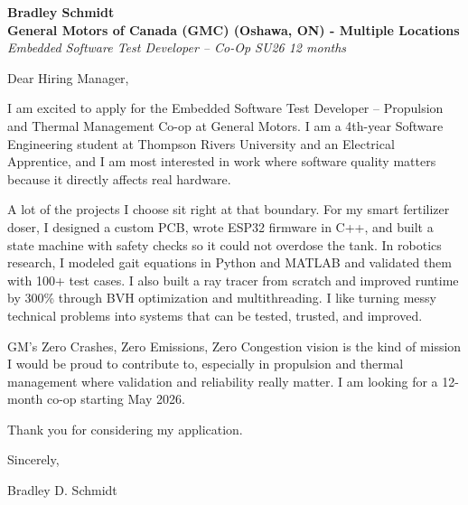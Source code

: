 \documentclass[11pt]{article}
\begin{document}
\textbf{Bradley Schmidt}\\
\vspace{0.5em}
\textbf{General Motors of Canada (GMC) (Oshawa, ON) - Multiple Locations}\\
\textit{Embedded Software Test Developer – Co-Op SU26 12 months}

Dear Hiring Manager,

\par

I am excited to apply for the Embedded Software Test Developer – Propulsion and Thermal Management Co-op at General Motors. I am a 4th-year Software Engineering student at Thompson Rivers University and an Electrical Apprentice, and I am most interested in work where software quality matters because it directly affects real hardware.

\par

A lot of the projects I choose sit right at that boundary. For my smart fertilizer doser, I designed a custom PCB, wrote ESP32 firmware in C++, and built a state machine with safety checks so it could not overdose the tank. In robotics research, I modeled gait equations in Python and MATLAB and validated them with 100+ test cases. I also built a ray tracer from scratch and improved runtime by 300\% through BVH optimization and multithreading. I like turning messy technical problems into systems that can be tested, trusted, and improved.

\par

GM's Zero Crashes, Zero Emissions, Zero Congestion vision is the kind of mission I would be proud to contribute to, especially in propulsion and thermal management where validation and reliability really matter. I am looking for a 12-month co-op starting May 2026.

\par

Thank you for considering my application.

\par

Sincerely,

\par

Bradley D. Schmidt
\end{document}
